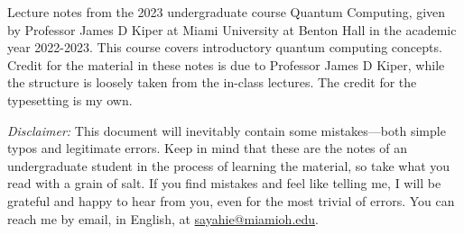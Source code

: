 Lecture notes from the 2023 undergraduate course Quantum Computing, given by Professor James D Kiper at Miami University at Benton Hall in the academic year 2022-2023. This course covers introductory quantum computing concepts. Credit for the material in these notes is due to Professor James D Kiper, while the structure is loosely taken from the in-class lectures. The credit for the typesetting is my own.

\textit{Disclaimer:} This document will inevitably contain some mistakes---both simple typos and legitimate errors. Keep in mind that these are the notes of an undergraduate student in the process of learning the material, so take what you read with a grain of salt. If you find mistakes and feel like telling me, I will be grateful and happy to hear from you, even for the most trivial of errors. You can reach me by email, in English, at \href{mailto:sayahie@miamioh.edu}{sayahie@miamioh.edu}.

\doclicenseThis
